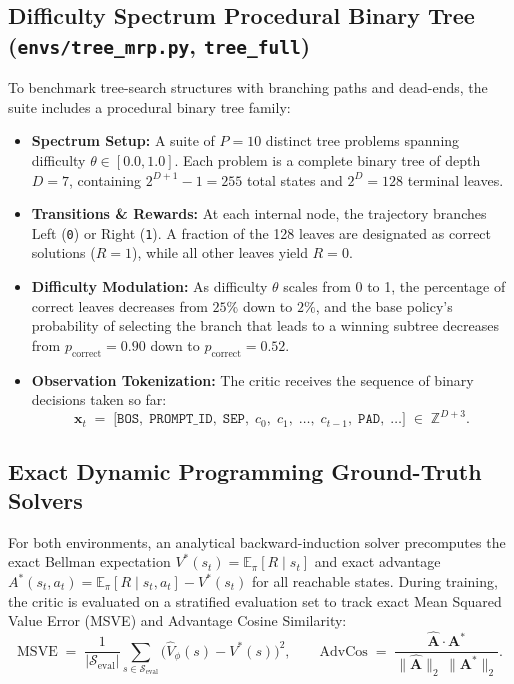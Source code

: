 \documentclass[11pt,a4paper]{article}
\begin{document}
\subsection{\texorpdfstring{Difficulty Spectrum Procedural Binary Tree (\texttt{envs/tree\_mrp.py}, \texttt{tree\_full})}{Difficulty Spectrum Procedural Binary Tree (tree\_full)}}

To benchmark tree-search structures with branching paths and dead-ends, the suite includes a procedural binary tree family:
\begin{itemize}[leftmargin=*, itemsep=2.5pt]
    \item \textbf{Spectrum Setup:} A suite of $P = 10$ distinct tree problems spanning difficulty $\theta \in [0.0, 1.0]$. Each problem is a complete binary tree of depth $D = 7$, containing $2^{D+1}-1 = 255$ total states and $2^D = 128$ terminal leaves.
    \item \textbf{Transitions \& Rewards:} At each internal node, the trajectory branches Left (\texttt{0}) or Right (\texttt{1}). A fraction of the 128 leaves are designated as correct solutions ($R = 1$), while all other leaves yield $R = 0$.
    \item \textbf{Difficulty Modulation:} As difficulty $\theta$ scales from 0 to 1, the percentage of correct leaves decreases from $25\%$ down to $2\%$, and the base policy's probability of selecting the branch that leads to a winning subtree decreases from $p_{\text{correct}} = 0.90$ down to $p_{\text{correct}} = 0.52$.
    \item \textbf{Observation Tokenization:} The critic receives the sequence of binary decisions taken so far:
    \[
        \mathbf{x}_t \;=\; \big[\texttt{BOS},\; \texttt{PROMPT\_ID},\; \texttt{SEP},\; c_0,\; c_1,\; \dots,\; c_{t-1},\; \texttt{PAD},\; \dots\big] \;\in\; \mathbb{Z}^{D+3}.
    \]
\end{itemize}

\subsection{Exact Dynamic Programming Ground-Truth Solvers}
For both environments, an analytical backward-induction solver precomputes the exact Bellman expectation $V^*(s_t) = \mathbb{E}_{\pi}[R \mid s_t]$ and exact advantage $A^*(s_t, a_t) = \mathbb{E}_{\pi}[R \mid s_t, a_t] - V^*(s_t)$ for all reachable states. During training, the critic is evaluated on a stratified evaluation set to track exact Mean Squared Value Error (MSVE) and Advantage Cosine Similarity:
\[
    \text{MSVE} \;=\; \frac{1}{|\mathcal{S}_{\text{eval}}|} \sum_{s \in \mathcal{S}_{\text{eval}}} \big(\hat{V}_\phi(s) - V^*(s)\big)^2, \qquad
    \text{AdvCos} \;=\; \frac{\hat{\mathbf{A}} \cdot \mathbf{A}^*}{\|\hat{\mathbf{A}}\|_2 \, \|\mathbf{A}^*\|_2}.
\]
\end{document}
